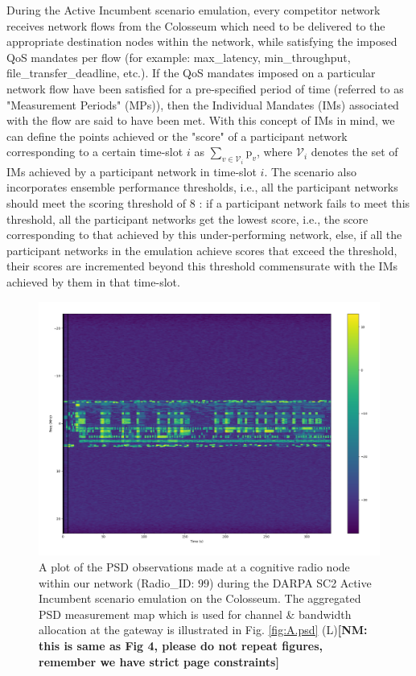 \documentclass[12pt, draftcls, onecolumn]{IEEEtran}
\newcommand{\nm}[1]{{\color{blue}\bf{[NM: #1]}}}
\begin{document}
During the Active Incumbent scenario emulation, every competitor network receives network flows from the Colosseum which need to be delivered to the appropriate destination nodes within the network, while satisfying the imposed QoS mandates per flow (for example: max\_latency, min\_throughput, file\_transfer\_deadline, etc.). If the QoS mandates imposed on a particular network flow have been satisfied for a pre-specified period of time (referred to as "Measurement Periods" (MPs)), then the Individual Mandates (IMs) associated with the flow are said to have been met. With this concept of IMs in mind, we can define the points achieved or the "score" of a participant network corresponding to a certain time-slot $i$ as $\sum_{v{\in}\mathcal{V}_{i}} \text{p}_{v}$, where $\mathcal{V}_{i}$ denotes the set of IMs achieved by a participant network in time-slot $i$. The scenario also incorporates ensemble performance thresholds, i.e., all the participant networks should meet the scoring threshold of $8$ \cite{DARPA:ActiveIncumbent}: if a participant network fails to meet this threshold, all the participant networks get the lowest score, i.e., the score corresponding to that achieved by this under-performing network, else, if all the participant networks in the emulation achieve scores that exceed the threshold, their scores are incremented beyond this threshold commensurate with the IMs achieved by them in that time-slot.
\begin{figure} [htb]
    \centerline{
    \includegraphics[width = 0.8\linewidth]{figures/PSD_Observations_Active_Incumbent.png}}
    \caption{A plot of the PSD observations made at a cognitive radio node within our network (Radio\_ID: $99$) during the DARPA SC2 Active Incumbent scenario emulation on the Colosseum. The aggregated PSD measurement map which is used for channel \& bandwidth allocation at the gateway is illustrated in Fig. \ref{fig:A.psd} (L)\nm{this is same as Fig 4, please do not repeat figures, remember we have strict page constraints}}
    \label{fig: Y. 3}
\end{figure}
\end{document}
